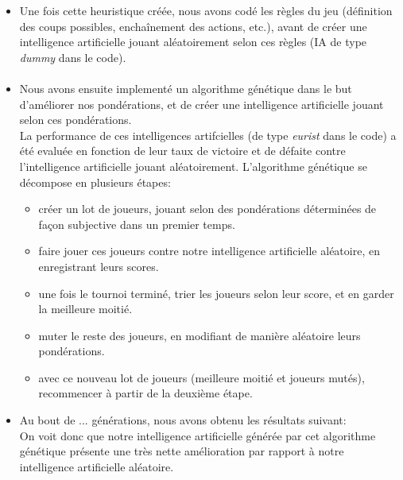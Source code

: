 \documentclass[10pt]{article}
\begin{document}
\begin{enumerate}
\begin{itemize}
\paragraph{}
\item Une fois cette heuristique créée, nous avons codé les règles du jeu (définition des coups possibles, enchaînement des actions, etc.), avant de créer une intelligence artificielle jouant aléatoirement selon ces règles (IA de type \textit{dummy} dans le code). 
\paragraph{}
\item Nous avons ensuite implementé un algorithme génétique dans le but d'améliorer nos pondérations, et de créer une intelligence artificielle jouant selon ces pondérations. \\
La performance de ces intelligences artifcielles (de type \textit{eurist} dans le code) a été evaluée en fonction de leur taux de victoire et de défaite contre l'intelligence artificielle jouant aléatoirement. 
L'algorithme génétique se décompose en plusieurs étapes: 
\begin{itemize}
    \item créer un lot de joueurs, jouant selon des pondérations déterminées de façon subjective dans un premier temps. 
    \item faire jouer ces joueurs contre notre intelligence artificielle aléatoire, en enregistrant leurs scores. 
    \item une fois le tournoi terminé, trier les joueurs selon leur score, et en garder la meilleure moitié. 
    \item muter le reste des joueurs, en modifiant de manière aléatoire leurs pondérations. 
    \item avec ce nouveau lot de joueurs (meilleure moitié et joueurs mutés), recommencer à partir de la deuxième étape.   
\end{itemize}

\item Au bout de ... générations, nous avons obtenu les résultats suivant: 
\\ 
On voit donc que notre intelligence artificielle générée par cet algorithme génétique présente une très nette amélioration par rapport à notre intelligence artificielle aléatoire. \\

\end{itemize}
\end{enumerate}
\end{document}

